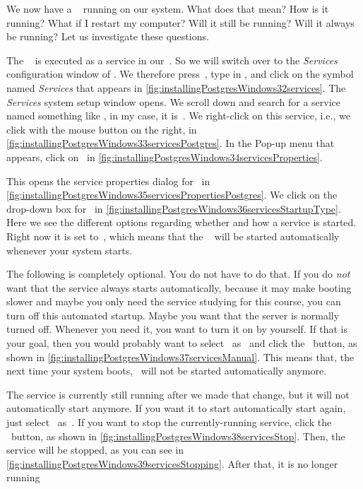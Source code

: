 We now have a \postgresql\   running on our system.
What does that mean?
How is it running?
What if I restart my computer?
Will it still be running?
Will it always be running?
Let us investigate these questions.

The \postgresql\  is executed as a service in our~.
So we will switch over to the \emph{Services} configuration window of \windows.
We therefore press~\keys{\OSwin}, type in , and click on the  symbol named \emph{Services} that appears in \cref{fig:installingPostgresWindows32services}.
The \emph{Services} system setup window opens.
We scroll down and search for a service named something like \postgresql, in my case, it is~.
We right-click on this service, i.e., we click with the mouse button on the right, in \cref{fig:installingPostgresWindows33servicesPostgres}.
In the Pop-up menu that appears, click on~ in \cref{fig:installingPostgresWindows34servicesProperties}.

This opens the service properties dialog for \postgresql\ in \cref{fig:installingPostgresWindows35servicesPropertiesPostgres}.
We click on the drop-down box for~ in \cref{fig:installingPostgresWindows36servicesStartupType}.
Here we see the different options regarding whether and how a service is started.
Right now it is set to~, which means that the \postgresql\   will be started automatically whenever your system starts.

The following is completely optional.
You do not have to do that.
If you do \emph{not} want that the service always starts automatically, because it may make booting slower and maybe you only need the service studying for this course, you can turn off this automated startup.
Maybe you want that the server is normally turned off.
Whenever you need it, you want to turn it on by yourself.
If that is your goal, then you would probably want to select~ as~ and click the ~button, as shown in \cref{fig:installingPostgresWindows37servicesManual}.
This means that, the next time your system boots, \postgresql\ will not be started automatically anymore.

The service is currently still running after we made that change, but it will not automatically start anymore.
If you want it to start automatically start again, just select~ as~. %
If you want to stop the currently-running service, click the ~button, as shown in \cref{fig:installingPostgresWindows38servicesStop}.
Then, the service will be stopped, as you can see in \cref{fig:installingPostgresWindows39servicesStopping}.
After that, it is no longer running

